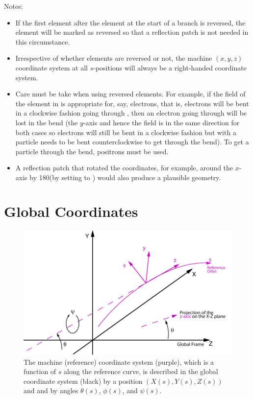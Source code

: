Notes:
\begin{itemize}
\item
If the first element after the  element at the start of a branch is reversed, the
 element will be marked as reversed so that a reflection patch is not needed in
this circumstance.
\item
Irrespective of whether elements are reversed or not, the machine $(x,y,z)$ coordinate system
at all $s$-positions will always be a right-handed coordinate system.
\item
Care must be take when using reversed elements. For example, if the field of the  element in
 is appropriate for, say, electrons, that is, electrons will be bent in a clockwise
fashion going through , then an electron going through  will be lost in the bend
(the $y$-axis and hence the field is in the same direction for both cases so electrons will still be
bent in a clockwise fashion but with  a particle needs to be bent counterclockwise to get
through the bend). To get a particle through the bend, positrons must be used.
\item
A reflection patch that rotated the coordinates, for example, around the $x$-axis by 180\Deg (by
setting  to ) would also produce a plausible geometry.
\end{itemize}

\section{Global Coordinates}
\label{s:global}

\begin{figure}[tb]
  \centering
  \includegraphics{global-coords.pdf}
  \caption[The Global Coordinate System]{
The machine (reference) coordinate system (purple), which is a function of $s$ along the reference
curve, is described in the global coordinate system (black) by a position $(X(s), Y(s), Z(s))$ and
and by angles $\theta(s)$, $\phi(s)$, and $\psi(s)$.
  }
  \label{f:global.coords}
\end{figure}

